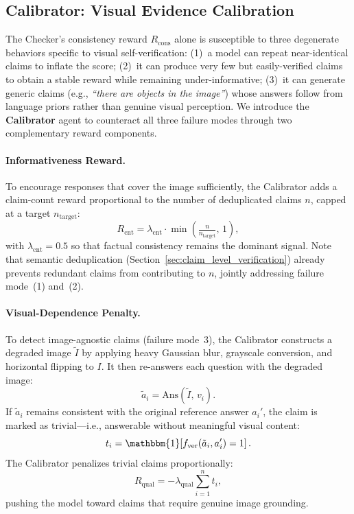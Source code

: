 \subsection{Calibrator: Visual Evidence Calibration}
\label{sec:calibrator}

The Checker's consistency reward $R_{\mathrm{cons}}$ alone is
susceptible to three degenerate behaviors specific to visual
self-verification: (1)~a model can repeat near-identical claims to
inflate the score; (2)~it can produce very few but easily-verified
claims to obtain a stable reward while remaining under-informative;
(3)~it can generate generic claims (e.g., \textit{``there are objects
in the image''}) whose answers follow from language priors rather than
genuine visual perception.
We introduce the \textbf{Calibrator} agent to counteract all three
failure modes through two complementary reward components.

\paragraph{Informativeness Reward.}
To encourage responses that cover the image sufficiently, the
Calibrator adds a claim-count reward proportional to the number of
deduplicated claims $n$, capped at a target $n_{\mathrm{target}}$:
\begin{equation}
    R_{\mathrm{cnt}}
    = \lambda_{\mathrm{cnt}}
      \cdot \min\!\left(\tfrac{n}{n_{\mathrm{target}}},\, 1\right),
\end{equation}
with $\lambda_{\mathrm{cnt}}=0.5$ so that factual consistency remains
the dominant signal.
Note that semantic deduplication (Section~\ref{sec:claim_level_verification})
already prevents redundant claims from contributing to $n$, jointly
addressing failure mode~(1) and~(2).

\paragraph{Visual-Dependence Penalty.}
To detect image-agnostic claims (failure mode~3), the Calibrator
constructs a degraded image $\tilde{I}$ by applying heavy Gaussian
blur, grayscale conversion, and horizontal flipping to $I$.
It then re-answers each question with the degraded image:
\begin{equation}
    \tilde{a}_i = \mathrm{Ans}(\tilde{I},\, v_i).
\end{equation}
If $\tilde{a}_i$ remains consistent with the original reference answer
$a_i'$, the claim is marked as trivial---i.e., answerable without
meaningful visual content:
\begin{equation}
    t_i = \mathbbm{1}\!\left[
        f_{\mathrm{ver}}(\tilde{a}_i, a_i') = 1
    \right].
\end{equation}
The Calibrator penalizes trivial claims proportionally:
\begin{equation}
    R_{\mathrm{qual}} = -\lambda_{\mathrm{qual}} \sum_{i=1}^{n} t_i,
\end{equation}
pushing the model toward claims that require genuine image grounding.

